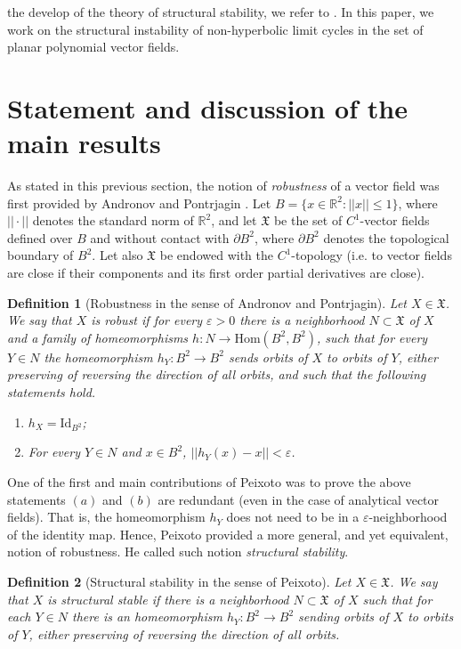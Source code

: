 \documentclass[11pt]{amsart}
\newtheorem{definition}{Definition}
\begin{document}
the develop of the theory of structural stability, we refer to \cite{SotGarMel2020,Sot2020}. In this paper, we work on the structural instability of non-hyperbolic limit cycles in the set of planar polynomial vector fields.

\section{Statement and discussion of the main results}

As stated in this previous section, the notion of \emph{robustness} of a vector field was first provided by Andronov and Pontrjagin \cite{AndPon1937}. Let $B=\{x\in\mathbb{R}^2\colon ||x||\leqslant1\}$, where $||\cdot||$ denotes the standard norm of $\mathbb{R}^2$, and let $\mathfrak{X}$ be the set of $C^1$-vector fields defined over $B$ and without contact with $\partial B^2$, where $\partial B^2$ denotes the topological boundary of $B^2$. Let also $\mathfrak{X}$ be endowed with the $C^1$-topology (i.e. to vector fields are close if their components and its first order partial derivatives are close).

\begin{definition}[Robustness in the sense of Andronov and Pontrjagin]
	Let $X\in\mathfrak{X}$. We say that $X$ is \emph{robust} if for every $\varepsilon>0$ there is a neighborhood $N\subset\mathfrak{X}$ of $X$ and a family of homeomorphisms $h\colon N\to\text{Hom}(B^2,B^2)$, such that for every $Y\in N$ the homeomorphism $h_Y\colon B^2\to B^2$ sends orbits of $X$ to orbits of $Y$, either preserving of reversing the direction of all orbits, and such that the following statements hold.
	\begin{enumerate}[label=(\alph*)]
		\item $h_X=\text{Id}_{B^2}$;
		\item For every $Y\in N$ and $x\in B^2$, $||h_Y(x)-x||<\varepsilon$.
	\end{enumerate}
\end{definition}

One of the first and main contributions of Peixoto \cite{Pei1959} was to prove the above statements $(a)$ and $(b)$ are redundant (even in the case of analytical vector fields). That is, the homeomorphism $h_Y$ does not need to be in a $\varepsilon$-neighborhood of the identity map. Hence, Peixoto provided a more general, and yet equivalent, notion of robustness. He called such notion \emph{structural stability}.

\begin{definition}[Structural stability in the sense of Peixoto]
	Let $X\in\mathfrak{X}$. We say that $X$ is \emph{structural stable} if there is a neighborhood $N\subset\mathfrak{X}$ of $X$ such that for each $Y\in N$ there is an homeomorphism $h_Y\colon B^2\to B^2$ sending orbits of $X$ to orbits of $Y$, either preserving of reversing the direction of all orbits.
\end{definition}
\end{document}
